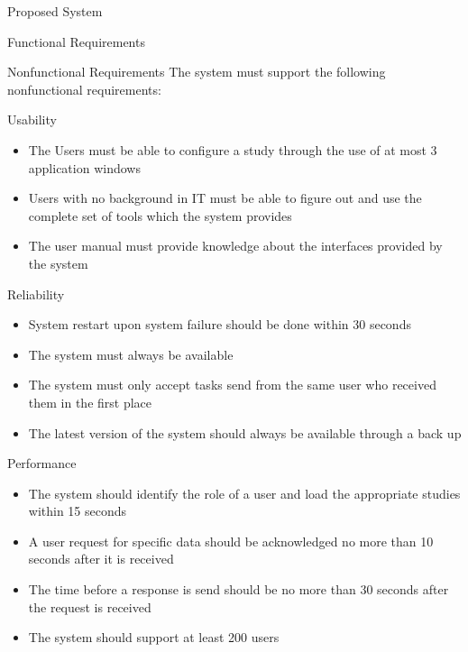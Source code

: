 \begin{section}{Proposed System}
\begin{subsection}{Functional Requirements}
\begin{itemize}
\end{itemize}

\end{subsection}

\begin{subsection}{Nonfunctional Requirements}
The system must support the following nonfunctional requirements:

\begin{subsubsection}{Usability}
\begin{itemize}
\item The Users must be able to configure a study through the use of at most 3 application windows
\item Users with no background in IT must be able to figure out and use the complete set of tools which the system provides
\item The user manual must provide knowledge about the interfaces provided by the system
\end{itemize}
\end{subsubsection}

\begin{subsubsection}{Reliability}
\begin{itemize}
\item System restart upon system failure should be done within 30 seconds
\item The system must always be available
\item The system must only accept tasks send from the same user who received them in the first place
\item The latest version of the system should always be available through a back up
\end{itemize}
\end{subsubsection}

\begin{subsubsection}{Performance}
\begin{itemize}
\item The system should identify the role of a user and load the appropriate studies within 15 seconds
\item A user request for specific data should be acknowledged no more than 10 seconds after it is received
\item The time before a response is send should be no more than 30 seconds after the request is received
\item The system should support at least 200 users
\end{itemize}
\end{subsubsection}


\end{subsection}
\end{section}
